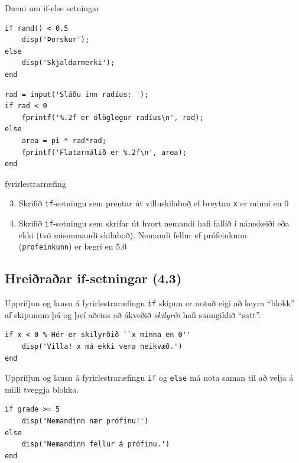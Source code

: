 \documentclass{beamer}
\begin{document}
\begin{frame}[fragile]{Dæmi um if-else setningar}
\begin{verbatim}
if rand() < 0.5
    disp('Þorskur');
else
    disp('Skjaldarmerki');
end
\end{verbatim}

\begin{verbatim}
rad = input('Sláðu inn radíus: ');
if rad < 0
    fprintf('%.2f er ólöglegur radíus\n', rad);
else
    area = pi * rad*rad;
    fprintf('Flatarmálið er %.2f\n', area);
end
\end{verbatim}
\end{frame}

\begin{frame}{fyrirlestrarræfing}
\begin{enumerate}
\setcounter{enumi}{2}
 \item Skrifið \texttt{if}-setningu sem prentar út villuskilaboð ef breytan \texttt{x} er minni en 0
 \item Skrifið \texttt{if}-setningu sem skrifar út hvort nemandi hafi fallið í námskeiði eða ekki (tvö mismunandi skilaboð).  Nemandi fellur ef prófeinkunn (\texttt{profeinkunn}) er lægri en 5.0
\end{enumerate}

\end{frame}

\subsection{Hreiðraðar if-setningar (4.3)}

\begin{frame}[fragile]{Upprifjun og lausn á fyrirlestraræfingu}
\texttt{if} skipun er notuð eigi að keyra ``blokk'' af skipunum þá og því aðeins að ákveðið \emph{skilyrði} hafi sanngildið ``satt''.
\begin{verbatim}
if x < 0 % Hér er skilyrðið ``x minna en 0''
    disp('Villa! x má ekki vera neikvæð.')
end
\end{verbatim}
\end{frame}

\begin{frame}[fragile]{Upprifjun og lausn á fyrirlestraræfingu}
\texttt{if} og \texttt{else} má nota saman til að velja á milli tveggja blokka.
\begin{verbatim}
if grade >= 5
    disp('Nemandinn nær prófinu!')
else
    disp('Nemandinn fellur á prófinu.')
end
\end{verbatim}
\end{frame}
\end{document}
